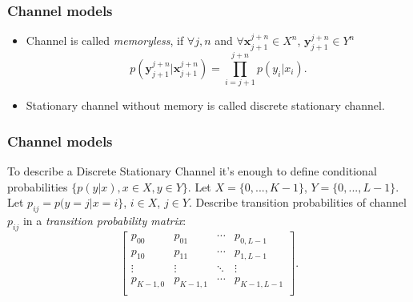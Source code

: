 \documentclass[14pt]{beamer}
\renewcommand{\vec}[1]{\ensuremath{\boldsymbol{#1}}}
\begin{document}
\begin{frame}
\frametitle{Channel models}
\begin{itemize}

\item
Channel is called \textit{memoryless}, if $\forall j,n $ and $\forall {\vec x}_{j + 1}^{j + n} \in X^n$, ${\vec y}_{j + 1}^{j
+ n} \in Y^n$
\[
p({\vec y}_{j + 1}^{j + n} \vert {\vec x}_{j + 1}^{j + n} ) =
\prod\limits_{i = j + 1}^{j + n} {p(y_i \vert x_i )} .
\]


\pause \item
Stationary channel without memory is called discrete stationary channel.

\end{itemize}
\end{frame}


\begin{frame}
\frametitle{Channel models}
\begin{itemize}
To describe a Discrete Stationary Channel it's enough to define conditional probabilities $\{p(y\vert x),x \in X,y \in Y\}$. Let $X = \{0,...,K - 1\}$, $Y = \{0,...,L - 1\}$. Let $p_{ij} = p(y = j\vert x = i\}$, $i \in X$, $j \in Y$. 
Describe transition probabilities of channel $p_{ij} $ in a \textit{transition probability matrix}:
\[
\left[
  \begin{array}{cccc}
    p_{00} & p_{01} & \cdots & p_{0,L - 1} \\
    p_{10} & p_{11} & \cdots & p_{1,L - 1} \\
    \vdots & \vdots & \ddots & \vdots \\
    p_{K - 1,0} & p_{K - 1,1} & \cdots & p_{K - 1,L - 1} \\
  \end{array}
\right].
\]

\end{itemize}
\end{frame}
\end{document}
